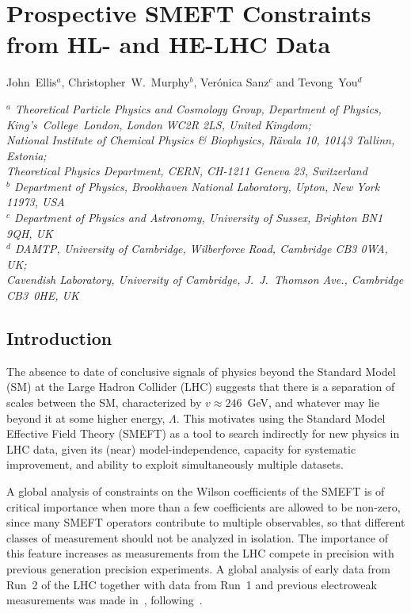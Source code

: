 \documentclass[../report.tex]{subfiles}
\begin{document}
\section{Prospective SMEFT Constraints from HL- and HE-LHC Data}
\label{sec8}
\begin{center}
\bigskip\vspace{1cm}
John~Ellis$^{a}$,
Christopher~W.~Murphy$^b$,%
Ver\'onica Sanz$^{c}$ and
Tevong~You$^{d}$
\begin{center}
{\em $^a$ Theoretical Particle Physics and Cosmology Group, Department of
  Physics, King's~College~London, London WC2R 2LS, United Kingdom;\\
National Institute of Chemical Physics \& Biophysics, R{\" a}vala 10, 10143 Tallinn, Estonia; \\
Theoretical Physics Department, CERN, CH-1211 Geneva 23,
  Switzerland}\\[0.2cm]
{\em $^b$ Department of Physics, Brookhaven National Laboratory, Upton, New York 11973, USA}\\[0.2cm]  
{\em $^c$ Department of Physics and Astronomy, University of Sussex, Brighton BN1 9QH, UK}\\[0.2cm]
{\em $^d$ DAMTP, University of Cambridge, Wilberforce Road, Cambridge CB3 0WA, UK;\\
Cavendish Laboratory, University of Cambridge, J.~J.~Thomson Ave., Cambridge CB3~0HE,
 UK}
\end{center}
\end{center}

\subsection{Introduction}
\label{sec8:intro}
The absence to date of conclusive signals of physics beyond the Standard Model (SM) at the Large Hadron Collider (LHC) suggests
that there is a separation of scales between the SM, characterized by $v \approx 246$~GeV, and whatever may lie beyond it at some higher energy, $\Lambda$.
This motivates using the Standard Model Effective Field Theory (SMEFT) as a tool to search indirectly for new physics in LHC data,
given its (near) model-independence, capacity for systematic improvement, and ability to exploit simultaneously multiple datasets.

A global analysis of constraints on the Wilson coefficients of the SMEFT is of critical importance when more than a few coefficients are allowed to be non-zero,
since many SMEFT operators contribute to multiple observables, so that different classes of measurement should not be analyzed in isolation.
The importance of this feature increases as
measurements from the LHC compete in precision with previous generation precision experiments.
A global analysis of early data from Run~2 of the LHC together with data from Run~1 and previous electroweak measurements
was made in~\cite{Ellis:2018gqa}, following~\cite{Ellis:2014dva, Ellis:2014jta, Murphy:2017omb}.
\end{document}
